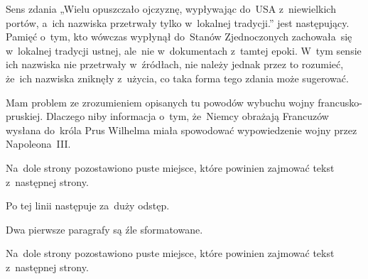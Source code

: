 \documentclass[a4paper,11pt]{article}
\begin{document}
\vspace{\spaceFour}





\noindent
{} Sens zdania „Wielu opuszczało ojczyznę, wypływając
do~USA z~niewielkich portów, a~ich nazwiska przetrwały tylko w~lokalnej
tradycji.” jest następujący. Pamięć o~tym, kto wówczas wypłynął do~Stanów
Zjednoczonych zachowała~się w~lokalnej tradycji ustnej, ale~nie
w~dokumentach z~tamtej epoki. W~tym sensie ich nazwiska nie przetrwały
w~źródłach, nie należy jednak przez to rozumieć, że~ich nazwiska zniknęły
z~użycia, co taka forma tego zdania może sugerować.

\vspace{\spaceFour}





\noindent
{} Mam problem ze zrozumieniem opisanych tu powodów wybuchu wojny
francusko-pruskiej. Dlaczego niby informacja o~tym, że~Niemcy obrażają
Francuzów wysłana do~króla Prus Wilhelma miała spowodować wypowiedzenie
wojny przez Napoleona~III.

\vspace{\spaceFour}





\noindent
{} Na~dole strony pozostawiono puste miejsce, które powinien
zajmować tekst z~następnej strony.

\vspace{\spaceFour}





\noindent
{} Po tej linii następuje za~duży odstęp.

\vspace{\spaceFour}





\noindent
{} Dwa pierwsze paragrafy są źle sformatowane.

\vspace{\spaceFour}





\noindent
{} Na~dole strony pozostawiono puste miejsce, które powinien
zajmować tekst z~następnej strony.

\vspace{\spaceFour}
\end{document}
